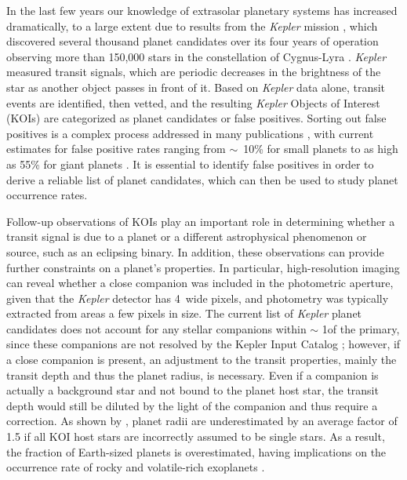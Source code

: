 \documentclass[twocolumn,appendixfloats]{aastex6}
\begin{document}
In the last few years our knowledge of extrasolar planetary systems has increased
dramatically, to a large extent due to results from the {\it Kepler} mission 
\citep{borucki10}, which discovered several thousand planet candidates over 
its four years of operation observing more than 150,000 stars in the constellation
of Cygnus-Lyra \citep{borucki11a,borucki11b, batalha13,burke14,
rowe15,seader15,mullally15, coughlin16}. {\it Kepler} measured transit signals, 
which are periodic decreases in the brightness of the star as another object 
passes in front of it. Based on {\it Kepler} data alone, transit events are identified, 
then vetted, and the resulting {\it Kepler} Objects of Interest (KOIs) are categorized 
as planet candidates or false positives. Sorting out false positives is a complex 
process addressed in many publications \citep{fressin13, coughlin14, seader15, 
mullally15, desert15, mccauliff15, santerne16, morton16}, with current estimates 
for false positive rates ranging from $\sim$~10\% for small planets \citep{fressin13} 
to as high as 55\% for giant planets \citep{santerne16,morton16}.
It is essential to identify false positives in order to derive a reliable list of planet 
candidates, which can then be used to study planet occurrence rates.  

Follow-up observations of KOIs play an important role in determining whether a
transit signal is due to a planet or a different astrophysical phenomenon or source, 
such as an eclipsing binary. In addition, these observations can provide further 
constraints on a planet's properties. In particular, high-resolution imaging can 
reveal whether a close companion was included in the photometric aperture, 
given that the {\it Kepler} detector has 4\arcsec\ wide pixels, and photometry 
was typically extracted from areas a few pixels in size. The current list of {\it Kepler} 
planet candidates does not account for any stellar companions within 
$\sim$ 1\arcsec{}\arcsec of the primary, since these companions are not 
resolved by the Kepler Input Catalog \citep[e.g.,][]{mullally15}; however, if a 
close companion is present, an adjustment to the transit properties, mainly 
the transit depth and thus the planet radius, is necessary. Even if a companion is 
actually a background star and not bound to the planet host star, the transit depth 
would still be diluted by the light of the companion and thus require a correction.
As shown by \citet{ciardi15}, planet radii are underestimated by an average factor 
of 1.5 if all KOI host stars are incorrectly assumed to be single stars. As a result, 
the fraction of Earth-sized planets is overestimated, having implications on the 
occurrence rate of rocky and volatile-rich exoplanets \citep[e.g.,][]{rogers15}. 
\end{document}
